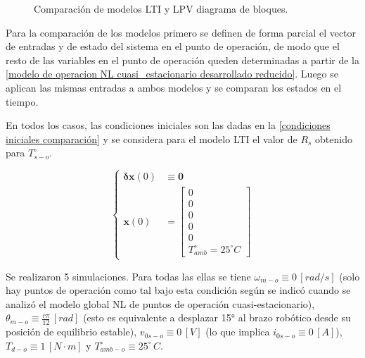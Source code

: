 \documentclass[a4paper, 10pt, onecolumn,journal]{ieeeconf}
\begin{document}
\begin{figure}[H]
	\centering
	\begin{adjustbox}{max width=\columnwidth}
	\end{adjustbox}
	\caption{Comparación de modelos LTI y LPV diagrama de bloques.}
	\label{diagrama de bloques LPV vs LTI}
\end{figure}

Para la comparación de los modelos primero se definen de forma parcial el vector de entradas y de estado del sistema en el punto de operación,
de modo que el resto de las variables en el punto de operación queden determinadas a partir de la \cref{modelo de operacion NL cuasi_estacionario desarrollado reducido}. Luego se aplican
las mismas entradas a ambos modelos y se comparan los estados en el tiempo.

En todos los casos, las condiciones iniciales son las dadas en la \cref{condiciones iniciales comparación} y se considera para 
el modelo LTI el valor de $R_s$ obtenido para $T^\circ_{s-o}$.

\begin{equation}
	\begin{cases}
		\mathbf{\delta x}(0) &\equiv \mathbf{0}\\
		\mathbf{x}(0) 
		&=
		\begin{bmatrix} 
			0 \\ 
			0 \\ 
			0 \\ 
			0 \\ 
			0 \\ 
			T^\circ_{amb} = 25^\circ C
		\end{bmatrix}
	\end{cases}
	\label{condiciones iniciales comparación}
\end{equation}

Se realizaron 5 simulaciones. Para todas las ellas se tiene 
$\omega_{m-o} \equiv 0\,\left[rad/s\right]$ (solo hay puntos de operación como tal bajo esta condición según
se indicó cuando se analizó el modelo global NL de puntos de operación cuasi-estacionario), $\theta_{m-o}\equiv \frac{r\pi}{12}\,\left[rad\right]$ (esto
es equivalente a desplazar 15° al brazo robótico desde su posición de equilibrio estable), $v_{0s-o} \equiv 0\,\left[V\right]$ (lo que implica $i_{0s-o}\equiv 0\, \left[A\right]$), $T_{d-o} \equiv 1\, \left[N\cdot m\right]$
y $T^\circ_{amb-o}\equiv 25^\circ\, C$.
\end{document}
